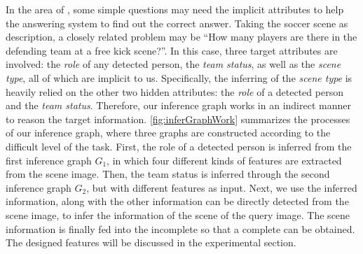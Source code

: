 In the area of \vqa, some simple questions may need the implicit attributes to help the answering system to find out the correct answer. 
Taking the soccer scene as description,
a closely related problem may be ``How many players are there in the defending team at a free kick scene?''. 
In this case, three target attributes are involved: the \emph{role} of any detected person, the \emph{team status}, as well as the \emph{scene type}, all of which are implicit to us. 
Specifically, the inferring of the \emph{scene type} is heavily relied on the other two hidden attributes: the \emph{role} of a detected person and the \emph{team status}. 
Therefore, our inference graph works in an indirect manner to reason the target information.
\autoref{fig:inferGraphWork} summarizes the processes of our inference graph, where three graphs are constructed according to the difficult level of the task. First, the role of a detected person is inferred from the first inference graph $G_1$, in which four different kinds of features are extracted from the scene image. Then, the team status is inferred through the second inference graph $G_2$, but with different features as input. Next, we use the inferred information, along with the other information can be directly detected from the scene image, to infer the information of the scene of the query image.
The scene information is finally fed into the incomplete  so that a complete  can be obtained. 
The designed features will be discussed in the experimental section.  

